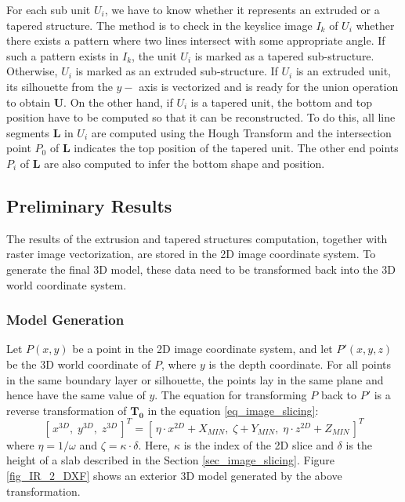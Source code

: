 \documentclass[12pt,letterpaper]{article}
\begin{document}
For each sub unit $U_i$, we have to know whether it represents an extruded or a tapered
structure. The method is to check in the keyslice image $I_k$ of $U_i$ whether there exists
a pattern where two lines intersect with some appropriate angle.
If such a pattern exists in $I_k$, the
unit $U_i$ is marked as a tapered sub-structure. Otherwise, $U_i$ is marked as
an extruded sub-structure. If $U_i$ is an extruded unit, its silhouette from the
$y-$ axis is vectorized and is ready for the union operation to obtain $\boldsymbol{U}$.
On the other hand, if $U_i$ is a tapered unit, the bottom and top position have to be computed
so that it can be reconstructed. To do this, all line segments $\boldsymbol{L}$ in $U_i$
are computed using the Hough Transform and the
intersection point $P_0$ of $\boldsymbol{L}$ indicates
the top position of the tapered unit. The other end points $P_i$ of $\boldsymbol{L}$ are also computed
to infer the bottom shape and position.


\subsection{Preliminary Results}
\label{sec_IR_OUT}

The results of the extrusion and tapered structures computation,
together with raster image vectorization, are stored in the 2D
image coordinate system. To generate the final 3D model, these
data need to be transformed
back into the 3D world coordinate system.

\subsubsection{Model Generation}

Let $P(x,y)$ be a point in the 2D image coordinate system, and let
$P'(x,y,z)$ be the 3D world coordinate of $P$, where $y$ is the depth coordinate.
For all points in the same boundary layer or silhouette,
the points lay in the same plane and hence have the same value of $y$.
The equation for transforming $P$ back to $P'$ is a reverse transformation of $\boldsymbol{T_0}$
in the equation \ref{eq_image_slicing}:
\begin{equation}\label{eq_ir2dxf}
[\,x^{3D},\; y^{3D},\; z^{3D}\,]^T = [\,\eta\cdot x^{2D} + X_{MIN},\; \zeta + Y_{MIN},\; \eta\cdot z^{2D} + Z_{MIN}\,]^T
\end{equation}
where $\eta=1/\omega$ and $\zeta=\kappa\cdot\delta$. Here, $\kappa$ is the index of the 2D slice and $\delta$
is the height of a slab described in the Section \ref{sec_image_slicing}.
Figure \ref{fig_IR_2_DXF} shows an exterior 3D model
generated by the above transformation.
\end{document}
